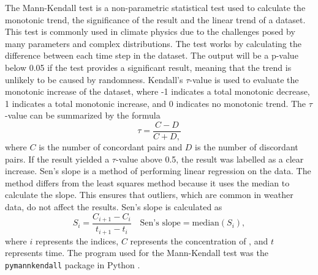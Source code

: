 The Mann-Kendall test is a non-parametric statistical test used to calculate the monotonic trend, the significance of the result and the linear trend of a dataset. This test is commonly used in climate physics due to the challenges posed by many parameters and complex distributions. The test works by calculating the difference between each time step in the dataset. The output will be a p-value below 0.05 if the test provides a significant result, meaning that the trend is unlikely to be caused by randomness. Kendall's $\tau$-value is used to evaluate the monotonic increase of the dataset, where -1 indicates a total monotonic decrease, 1 indicates a total monotonic increase, and 0 indicates no monotonic trend. The $\tau$-value can be summarized by the formula 
\begin{equation}
    \tau = \frac{C - D}{C + D,}
    \label{eq:Kendalltau}
\end{equation}
where $C$ is the number of concordant pairs and $D$ is the number of discordant pairs. If the result yielded a $\tau$-value above 0.5, the result was labelled as a clear increase. Sen's slope is a method of performing linear regression on the data. The method differs from the least squares method because it uses the median to calculate the slope. This ensures that outliers, which are common in weather data, do not affect the results. Sen's slope is calculated as 
\begin{equation}
    S_{i} = \frac{C_{i+1} - C_i}{t_{i+1} - t_i} \quad \text{Sen's slope} = \text{median}(S_{i}),
    \label{eq:Senslope}
\end{equation}
where $i$ represents the indices, $C$ represents the concentration of \PM, and $t$ represents time. The program used for the Mann-Kendall test was the \texttt{pymannkendall} package in Python \cite{hussainmd.PyMannKendallPythonPackage2019}.
